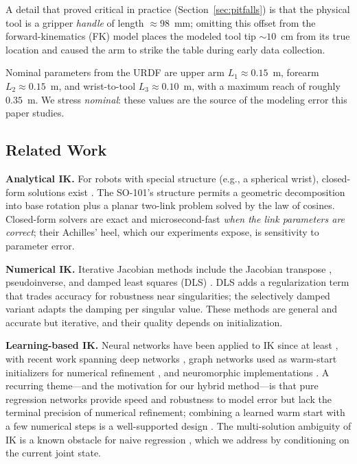 \documentclass[conference]{IEEEtran}
\begin{document}
A detail that proved critical in practice (Section~\ref{sec:pitfalls}) is that the physical tool is a gripper \emph{handle} of length $\approx\!98$~mm; omitting this offset from the forward-kinematics (FK) model places the modeled tool tip $\sim\!10$~cm from its true location and caused the arm to strike the table during early data collection.

Nominal parameters from the URDF are upper arm $L_1\!\approx\!0.15$~m, forearm $L_2\!\approx\!0.15$~m, and wrist-to-tool $L_3\!\approx\!0.10$~m, with a maximum reach of roughly $0.35$~m. We stress \emph{nominal}: these values are the source of the modeling error this paper studies.

\subsection{Related Work}

\textbf{Analytical IK.} For robots with special structure (e.g., a spherical wrist), closed-form solutions exist \cite{paul1981robot, craig2005introduction}. The SO-101's structure permits a geometric decomposition into base rotation plus a planar two-link problem solved by the law of cosines. Closed-form solvers are exact and microsecond-fast \emph{when the link parameters are correct}; their Achilles' heel, which our experiments expose, is sensitivity to parameter error.

\textbf{Numerical IK.} Iterative Jacobian methods include the Jacobian transpose \cite{wolovich1984simple}, pseudoinverse, and damped least squares (DLS) \cite{nakamura1986inverse, buss2004introduction}. DLS adds a regularization term that trades accuracy for robustness near singularities; the selectively damped variant \cite{buss2005selectively} adapts the damping per singular value. These methods are general and accurate but iterative, and their quality depends on initialization.

\textbf{Learning-based IK.} Neural networks have been applied to IK since at least \cite{duka2014neural}, with recent work spanning deep networks \cite{bensadoun2022neural, malik2022deepnn}, graph networks used as warm-start initializers for numerical refinement \cite{limXGNN2025}, and neuromorphic implementations \cite{volinski2023neuromorphic}. A recurring theme---and the motivation for our hybrid method---is that pure regression networks provide speed and robustness to model error but lack the terminal precision of numerical refinement; combining a learned warm start with a few numerical steps is a well-supported design \cite{limXGNN2025}. The multi-solution ambiguity of IK is a known obstacle for naive regression \cite{bensadoun2022neural}, which we address by conditioning on the current joint state.
\end{document}
